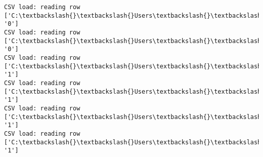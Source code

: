 \documentclass[11pt]{article}
\begin{document}
\begin{Verbatim}[commandchars=\\\{\}]
CSV load: reading row ['C:\textbackslash{}\textbackslash{}Users\textbackslash{}\textbackslash{}AbhishekGangadhar\textbackslash{}\textbackslash{}Downloads\textbackslash{}\textbackslash{}ActionRecog\textbackslash{}\textbackslash{}ActionRecog\textbackslash{}\textbackslash{}DataSets\textbackslash{}\textbackslash{}UCF11\textbackslash{}\textbackslash{}action\_youtube\_naudio\textbackslash{}\textbackslash{}biking\textbackslash{}\textbackslash{}v\_biking\_03\textbackslash{}\textbackslash{}v\_biking\_03\_03.avi', '0']
CSV load: reading row ['C:\textbackslash{}\textbackslash{}Users\textbackslash{}\textbackslash{}AbhishekGangadhar\textbackslash{}\textbackslash{}Downloads\textbackslash{}\textbackslash{}ActionRecog\textbackslash{}\textbackslash{}ActionRecog\textbackslash{}\textbackslash{}DataSets\textbackslash{}\textbackslash{}UCF11\textbackslash{}\textbackslash{}action\_youtube\_naudio\textbackslash{}\textbackslash{}biking\textbackslash{}\textbackslash{}v\_biking\_03\textbackslash{}\textbackslash{}v\_biking\_03\_04.avi', '0']
CSV load: reading row ['C:\textbackslash{}\textbackslash{}Users\textbackslash{}\textbackslash{}AbhishekGangadhar\textbackslash{}\textbackslash{}Downloads\textbackslash{}\textbackslash{}ActionRecog\textbackslash{}\textbackslash{}ActionRecog\textbackslash{}\textbackslash{}DataSets\textbackslash{}\textbackslash{}UCF11\textbackslash{}\textbackslash{}action\_youtube\_naudio\textbackslash{}\textbackslash{}golf\_swing\textbackslash{}\textbackslash{}v\_golf\_21\textbackslash{}\textbackslash{}v\_golf\_21\_01.avi', '1']
CSV load: reading row ['C:\textbackslash{}\textbackslash{}Users\textbackslash{}\textbackslash{}AbhishekGangadhar\textbackslash{}\textbackslash{}Downloads\textbackslash{}\textbackslash{}ActionRecog\textbackslash{}\textbackslash{}ActionRecog\textbackslash{}\textbackslash{}DataSets\textbackslash{}\textbackslash{}UCF11\textbackslash{}\textbackslash{}action\_youtube\_naudio\textbackslash{}\textbackslash{}golf\_swing\textbackslash{}\textbackslash{}v\_golf\_21\textbackslash{}\textbackslash{}v\_golf\_21\_02.avi', '1']
CSV load: reading row ['C:\textbackslash{}\textbackslash{}Users\textbackslash{}\textbackslash{}AbhishekGangadhar\textbackslash{}\textbackslash{}Downloads\textbackslash{}\textbackslash{}ActionRecog\textbackslash{}\textbackslash{}ActionRecog\textbackslash{}\textbackslash{}DataSets\textbackslash{}\textbackslash{}UCF11\textbackslash{}\textbackslash{}action\_youtube\_naudio\textbackslash{}\textbackslash{}golf\_swing\textbackslash{}\textbackslash{}v\_golf\_21\textbackslash{}\textbackslash{}v\_golf\_21\_03.avi', '1']
CSV load: reading row ['C:\textbackslash{}\textbackslash{}Users\textbackslash{}\textbackslash{}AbhishekGangadhar\textbackslash{}\textbackslash{}Downloads\textbackslash{}\textbackslash{}ActionRecog\textbackslash{}\textbackslash{}ActionRecog\textbackslash{}\textbackslash{}DataSets\textbackslash{}\textbackslash{}UCF11\textbackslash{}\textbackslash{}action\_youtube\_naudio\textbackslash{}\textbackslash{}golf\_swing\textbackslash{}\textbackslash{}v\_golf\_21\textbackslash{}\textbackslash{}v\_golf\_21\_04.avi', '1']

\end{Verbatim}
\end{document}
